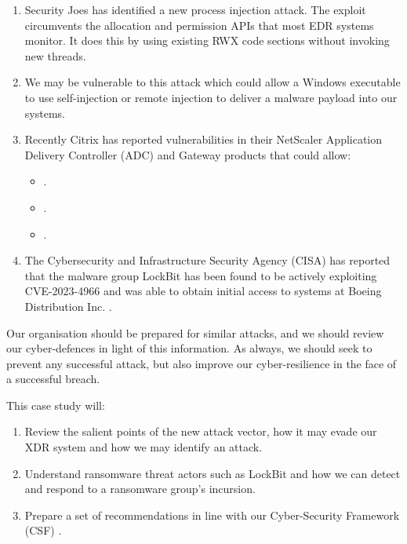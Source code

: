 \begin{enumerate}
\item Security Joes has identified a new process injection attack.  The exploit circumvents the allocation
  and permission APIs that most EDR systems monitor.  It  does this by using existing RWX code sections without invoking
  new threads.
\item We may be vulnerable to this attack which could allow a Windows executable to use self-injection or remote injection to deliver a malware payload into our systems.
\item Recently Citrix has reported vulnerabilities in their NetScaler Application Delivery Controller (ADC) and Gateway products that
  could allow:
  \begin{itemize}
  \item {} \autocite{CVE-2023-3467}.
  \item {} \autocite{CVE-2023-3519}.
  \item {} \autocite{CVE-2023-4966}.
  \end{itemize}
\item The Cybersecurity and Infrastructure Security Agency (CISA) has reported that the malware group LockBit \autocite{CISA:2023a} has
  been found to be actively exploiting CVE-2023-4966 and was able to obtain initial access to systems at Boeing Distribution Inc. \autocite{CISA:2023b}.
\end{enumerate}

Our organisation should be prepared for similar attacks, and we should review our cyber-defences in light of this information.
As always, we should seek to prevent any successful attack, but also improve our cyber-resilience in the face of a successful breach.

This case study will:
\begin{enumerate}
\item Review the salient points of the new attack vector, how it may evade our XDR system and how we may identify an attack.
\item Understand ransomware threat actors such as LockBit and how we can detect and respond to a ransomware group's incursion.
\item Prepare a set of recommendations in line with our Cyber-Security Framework (CSF) \autocite{NIST:2018}.
\end{enumerate}


